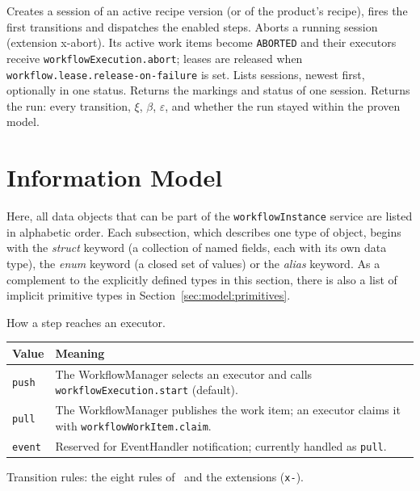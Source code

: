 \documentclass[a4paper]{arrowhead}
\begin{document}
Creates a session of an active recipe version (or of the product's recipe), fires the first transitions and dispatches the enabled steps.
Aborts a running session (extension x-abort). Its active work items become \texttt{ABORTED} and their executors receive \texttt{workflowExecution.abort}; leases are released when \texttt{workflow.lease.release-on-failure} is set.
Lists sessions, newest first, optionally in one status.
Returns the markings and status of one session.
Returns the run: every transition, $\xi$, $\beta$, $\varepsilon$, and whether the run stayed within the proven model.

\newpage
\section{Information Model}
\label{sec:model}
Here, all data objects that can be part of the \texttt{workflowInstance} service are listed in alphabetic order. Each
subsection, which describes one type of object, begins with the \textit{struct} keyword (a collection of named fields,
each with its own data type), the \textit{enum} keyword (a closed set of values) or the \textit{alias} keyword. As a
complement to the explicitly defined types in this section, there is also a list of implicit primitive types in
Section~\ref{sec:model:primitives}.

How a step reaches an executor.

{\small
\begin{longtable}{|p{3.9cm}|p{11.9cm}|}

\hline
\rowcolor{gray!33} Value & Meaning \\ \hline
\endhead
\texttt{push} & The WorkflowManager selects an executor and calls \texttt{workflowExecution.start} (default). \\ \hline
\texttt{pull} & The WorkflowManager publishes the work item; an executor claims it with \texttt{workflowWorkItem.claim}. \\ \hline
\texttt{event} & Reserved for EventHandler notification; currently handled as \texttt{pull}. \\ \hline
\end{longtable}
}

Transition rules: the eight rules of~\cite{varga2026} and the extensions (\texttt{x-}).
\end{document}
